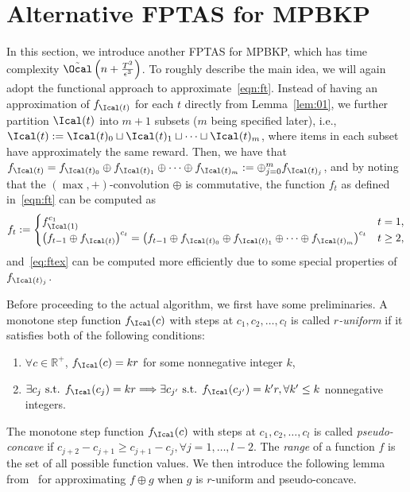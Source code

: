 \section{Alternative FPTAS for MPBKP}\label{appT2}
In this section, we introduce another FPTAS for MPBKP, which has time complexity $\tilde{\Ocal}\left(n+\frac{T^2}{\epsilon^3}\right)$. To roughly describe the main idea, we will again adopt the functional approach to approximate~\eqref{eqn:ft}. Instead of having an approximation of $f_{\Ical(t)}$ for each $t$ directly from Lemma~\ref{lem:01}, we further partition $\Ical(t)$ into $m+1$ subsets ($m$ being specified later), i.e., $\Ical(t):=\Ical(t)_0\sqcup \Ical(t)_1\sqcup\cdots\sqcup \Ical(t)_m$, where items in each subset have approximately the same reward. Then, we have that $f_{\Ical(t)} = f_{\Ical(t)_0}\oplus f_{\Ical(t)_1}\oplus\cdots \oplus f_{\Ical(t)_m}:=\oplus_{j=0}^mf_{\Ical(t)_j}$, and by noting that the $(\max,+)$-convolution $\oplus$ is commutative, the function $f_t$ as defined in~\eqref{eqn:ft} can be computed as 
\begin{align}\label{eq:ftex}
f_t := \begin{cases}
f_{\Ical(1)}^{c_1} & t=1,\\
\left(f_{t-1}\oplus f_{\Ical(t)}\right)^{c_t} = \left(f_{t-1}\oplus f_{\Ical(t)_0}\oplus f_{\Ical(t)_1}\oplus\cdots \oplus f_{\Ical(t)_m}\right)^{c_t} & t\ge 2,
\end{cases}
\end{align}
and~\eqref{eq:ftex} can be computed more efficiently due to some special properties of $f_{\Ical(t)_j}$.

Before proceeding to the actual algorithm, we first have some preliminaries. A monotone step function $f_{\Ical}(c)$ with steps at $c_{1},c_{2},\ldots,c_l$ is called \emph{$r$-uniform} if it satisfies both of the following conditions:
\begin{enumerate}
	\item $\forall c\in\mathbb{R}^+$, $f_{\Ical}(c) = kr$ for some nonnegative integer $k$,
	\item $\exists c_{j} \text{ s.t. } f_{\Ical}(c_j)=kr \Longrightarrow \exists c_{j'} \text{ s.t. }f_{\Ical}(c_{j'}) = k'r, \forall k'\le k$ nonnegative integers.
\end{enumerate}
The monotone step function $f_{\Ical}(c)$ with steps at $c_{1},c_{2},\ldots,c_l$ is called \emph{pseudo-concave} if $c_{j+2} - c_{j+1}\ge c_{j+1}-c_{j}, \forall j=1,\ldots, l-2$. The \emph{range} of a function $f$ is the set of all possible function values. We then introduce the following lemma from~\cite{chan:OASIcs:2018:8299} for approximating $f\oplus g$ when $g$ is $r$-uniform and pseudo-concave. 

